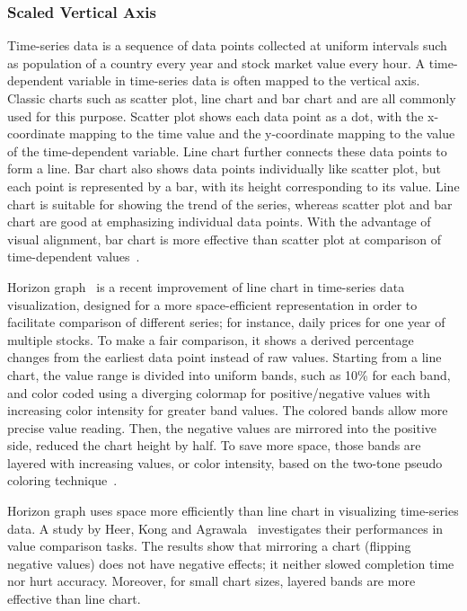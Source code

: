 \subsubsection{Scaled Vertical Axis}
Time-series data is a sequence of data points collected at uniform intervals such as population of a country every year and stock market value every hour. A time-dependent variable in time-series data is often mapped to the vertical axis. Classic charts such as scatter plot, line chart and bar chart and are all commonly used for this purpose. Scatter plot shows each data point as a dot, with the x-coordinate mapping to the time value and the y-coordinate mapping to the value of the time-dependent variable. Line chart further connects these data points to form a line. Bar chart also shows data points individually like scatter plot, but each point is represented by a bar, with its height corresponding to its value. Line chart is suitable for showing the trend of the series, whereas scatter plot and bar chart are good at emphasizing individual data points. With the advantage of visual alignment, bar chart is more effective than scatter plot at comparison of time-dependent values~\cite{Aigner2011}.


Horizon graph~\cite{Reijner2008} is a recent improvement of line chart in time-series data visualization, designed for a more space-efficient representation in order to facilitate comparison of different series; for instance, daily prices for one year of multiple stocks. To make a fair comparison, it shows a derived percentage changes from the earliest data point instead of raw values. Starting from a line chart, the value range is divided into uniform bands, such as 10\% for each band, and color coded using a diverging colormap for positive/negative values with increasing color intensity for greater band values. The colored bands allow more precise value reading. Then, the negative values are mirrored into the positive side, reduced the chart height by half. To save more space, those bands are layered with increasing values, or color intensity, based on the two-tone pseudo coloring technique~\cite{Saito2005}.


Horizon graph uses space more efficiently than line chart in visualizing time-series data. A study by Heer, Kong and Agrawala~\cite{Heer2009a} investigates their performances in value comparison tasks. The results show that mirroring a chart (flipping negative values) does not have negative effects; it neither slowed completion time nor hurt accuracy. Moreover, for small chart sizes, layered bands are more effective than line chart.

